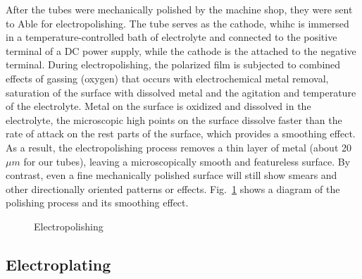 After the tubes were mechanically polished by the machine shop, they were sent to Able for electropolishing. The tube serves as the cathode, whihc is immersed in a temperature-controlled bath of electrolyte and connected to the positive terminal of a DC power supply, while the cathode is the attached to the negative terminal. During electropolishing, the polarized film is subjected to combined effects of gassing (oxygen) that occurs with electrochemical metal removal, saturation of the surface with dissolved metal and the agitation and temperature of the electrolyte. Metal on the surface is oxidized and dissolved in the electrolyte, the microscopic high points on the surface dissolve faster than the rate of attack on the rest parts of the surface, which provides a smoothing effect. As a result, the electropolishing process removes a thin layer of metal (about 20 $\mu m$ for our tubes), leaving a microscopically smooth and featureless surface. By contrast, even a fine mechanically polished surface will still show smears and other directionally oriented patterns or effects\cite{Electropolishing}. Fig.~\ref{Electropolishing} shows a diagram of the polishing process and its smoothing effect.

\begin{figure}[t!]
	\centering
	\caption{{Electropolishing~\cite{Electropolishing}}}
	\label{Electropolishing}
\end{figure}

\subsection{Electroplating}

